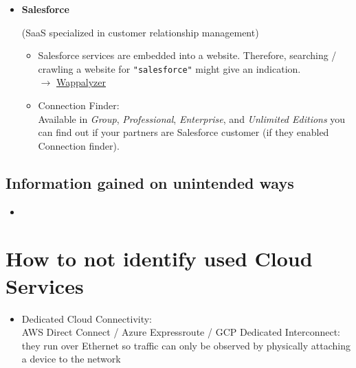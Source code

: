 \documentclass[12pt]{article}
\begin{document}
\begin{itemize}
    
    \item \textbf{Salesforce}
    
    (SaaS specialized in customer relationship management)
    
    \begin{itemize}
        \item Salesforce services are embedded into a website. Therefore, searching / crawling a website for \verb|"salesforce"| might give an indication. \\
        $\rightarrow$ \href{https://www.wappalyzer.com/lists/?technologies=salesforce}{Wappalyzer}
        
        \item Connection Finder: \\
        Available in \textit{Group}, \textit{Professional}, \textit{Enterprise}, and \textit{Unlimited Editions} you can find out if your partners are Salesforce customer (if they enabled Connection finder).
    \end{itemize}
    
    
 
 
 
\end{itemize}

\subsection*{Information gained on unintended ways}
\begin{itemize}
    \item 
\end{itemize}


\newpage
\section*{How to not identify used Cloud Services}
\begin{itemize}
    \item Dedicated Cloud Connectivity: \\ AWS Direct Connect / Azure Expressroute / GCP Dedicated Interconnect: they run over Ethernet so traffic can only be observed by physically attaching a device to the network
\end{itemize}
\end{document}
